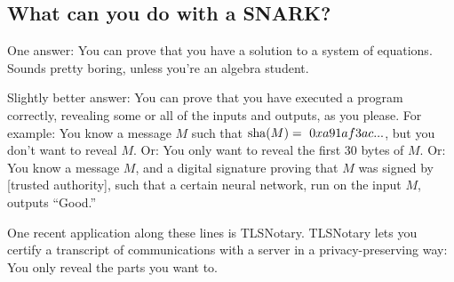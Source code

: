 \subsection{What can you do with a SNARK?}

One answer: You can prove that you have a solution to a system of
equations. Sounds pretty boring, unless you're an algebra student.

Slightly better answer: You can prove that you have executed a program
correctly, revealing some or all of the inputs and outputs, as you
please. For example: You know a message $M$ such that
$\operatorname{sha}(M) = \ 0xa91af3ac...$, but you don't want to
reveal $M$. Or: You only want to reveal the first 30 bytes of $M$.
Or: You know a message $M$, and a digital signature proving that $M$
was signed by [trusted authority], such that a certain neural
network, run on the input $M$, outputs ``Good.''

One recent application along these lines is TLSNotary.
TLSNotary lets you certify a transcript of communications with a server
in a privacy-preserving way: You only reveal the parts you want to.
